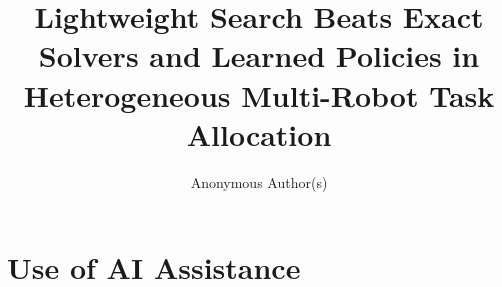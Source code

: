 \documentclass[sigconf,anonymous]{aamas}
\title[Lightweight Search for Heterogeneous Multi-Robot Task Allocation]{Lightweight Search Beats Exact Solvers and
Learned Policies in Heterogeneous Multi-Robot Task Allocation}
\author{Anonymous Author(s)}
\affiliation{\institution{Anonymous Institution}\country{Anonymous}}
\begin{document}
\pagestyle{fancy}
\fancyhead{}

\maketitle









\section*{Use of AI Assistance}


\balance


\end{document}
